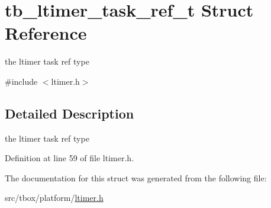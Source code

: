 \hypertarget{structtb__ltimer__task__ref__t}{\section{tb\-\_\-ltimer\-\_\-task\-\_\-ref\-\_\-t Struct Reference}
\label{structtb__ltimer__task__ref__t}
}


the ltimer task ref type  




{\ttfamily \#include $<$ltimer.\-h$>$}



\subsection{Detailed Description}
the ltimer task ref type 

Definition at line 59 of file ltimer.\-h.



The documentation for this struct was generated from the following file\-:\begin{DoxyCompactItemize}
\item 
src/tbox/platform/\hyperlink{ltimer_8h}{ltimer.\-h}\end{DoxyCompactItemize}
